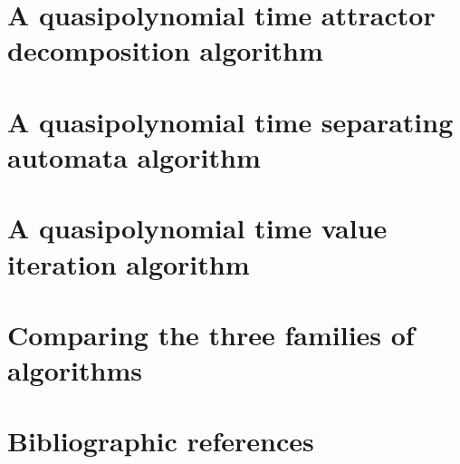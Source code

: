 
\section{A quasipolynomial time attractor decomposition algorithm}
\label{3-sec:quasipolynomial_zielonka}



\section{A quasipolynomial time separating automata algorithm}
\label{3-sec:separation}



\section{A quasipolynomial time value iteration algorithm}
\label{3-sec:value_iteration}



\section{Comparing the three families of algorithms}
\label{3-sec:relationships}



\section*{Bibliographic references}
\label{3-sec:references}





